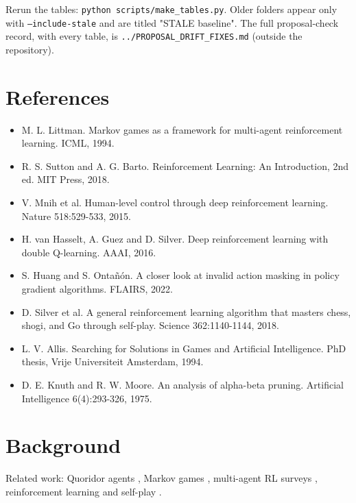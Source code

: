 \documentclass[11pt]{article}
\begin{document}
Rerun the tables: \texttt{python scripts/make\_tables.py}. Older folders appear only with
\texttt{--include-stale} and are titled "STALE baseline". The full proposal-check record, with every
table, is \texttt{../PROPOSAL\_DRIFT\_FIXES.md} (outside the repository).

\section{References}

\begin{itemize}
\item [1] M. L. Littman. Markov games as a framework for multi-agent reinforcement learning. ICML, 1994.
\item [2] R. S. Sutton and A. G. Barto. Reinforcement Learning: An Introduction, 2nd ed. MIT Press, 2018.
\item [3] V. Mnih et al. Human-level control through deep reinforcement learning. Nature 518:529-533, 2015.
\item [4] H. van Hasselt, A. Guez and D. Silver. Deep reinforcement learning with double Q-learning. AAAI, 2016.
\item [5] S. Huang and S. Ontañón. A closer look at invalid action masking in policy gradient algorithms. FLAIRS, 2022.
\item [6] D. Silver et al. A general reinforcement learning algorithm that masters chess, shogi, and Go through self-play. Science 362:1140-1144, 2018.
\item [7] L. V. Allis. Searching for Solutions in Games and Artificial Intelligence. PhD thesis, Vrije Universiteit Amsterdam, 1994.
\item [8] D. E. Knuth and R. W. Moore. An analysis of alpha-beta pruning. Artificial Intelligence 6(4):293-326, 1975.
\end{itemize}
\section*{Background}
Related work: Quoridor agents \cite{jose2022quoridor}, Markov games \cite{littman1994markov}, multi-agent RL surveys \cite{busoniu2008comprehensive,zhang2021selective}, reinforcement learning \cite{sutton2018reinforcement} and self-play \cite{silver2018alphazero}.


\end{document}

